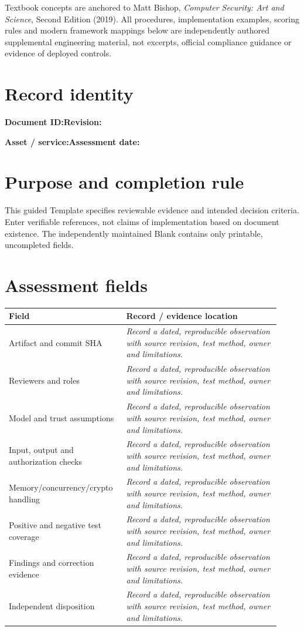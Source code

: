 \documentclass[10pt,letterpaper]{article}
\begin{document}
\makedoctocpage
\begin{notebox}
Textbook concepts are anchored to Matt Bishop, \emph{Computer Security: Art and Science}, Second Edition (2019). All procedures, implementation examples, scoring rules and modern framework mappings below are independently authored supplemental engineering material, not excerpts, official compliance guidance or evidence of deployed controls.
\end{notebox}
\section{Record identity}
\textbf{Document ID:}\enspace\hrulefill\quad\textbf{Revision:}\enspace\hrulefill
\par\medskip\textbf{Asset / service:}\enspace\hrulefill\quad\textbf{Assessment date:}\enspace\hrulefill
\section{Purpose and completion rule}
This guided Template specifies reviewable evidence and intended decision criteria. Enter verifiable references, not claims of implementation based on document existence. The independently maintained Blank contains only printable, uncompleted fields.
\section{Assessment fields}
\renewcommand{\arraystretch}{1.8}
\begin{longtable}{@{}p{0.38\linewidth}p{0.54\linewidth}@{}}
\toprule\textbf{Field}&\textbf{Record / evidence location}\\\midrule\endhead
Artifact and commit SHA & \emph{Record a dated, reproducible observation with source revision, test method, owner and limitations.}\\\midrule
Reviewers and roles & \emph{Record a dated, reproducible observation with source revision, test method, owner and limitations.}\\\midrule
Model and trust assumptions & \emph{Record a dated, reproducible observation with source revision, test method, owner and limitations.}\\\midrule
Input, output and authorization checks & \emph{Record a dated, reproducible observation with source revision, test method, owner and limitations.}\\\midrule
Memory/concurrency/crypto handling & \emph{Record a dated, reproducible observation with source revision, test method, owner and limitations.}\\\midrule
Positive and negative test coverage & \emph{Record a dated, reproducible observation with source revision, test method, owner and limitations.}\\\midrule
Findings and correction evidence & \emph{Record a dated, reproducible observation with source revision, test method, owner and limitations.}\\\midrule
Independent disposition & \emph{Record a dated, reproducible observation with source revision, test method, owner and limitations.}\\\midrule
\bottomrule\end{longtable}
\end{document}
